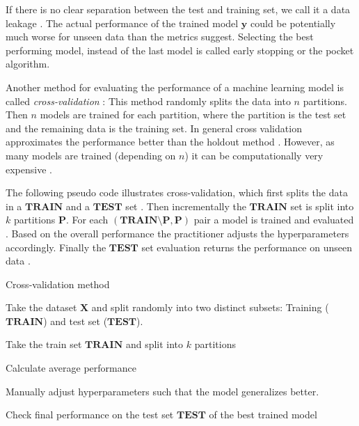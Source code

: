 \documentclass[draft,final,oneside]{vutinfth} %
\begin{document}
If there is no clear separation between the test and training set, we call it a data leakage \cite{doingdatascience}. The actual performance of the trained model $\boldsymbol{y}$ could be potentially much worse for unseen data than the metrics suggest. Selecting the best performing model, instead of the last model is called early stopping or the pocket algorithm.

Another method for evaluating the performance of a machine learning model is called \textit{cross-validation} \cite{holdoutcrossvalidation}: This method randomly splits the data into $n$ partitions. Then $n$ models are trained for each partition, where the partition is the test set and the remaining data is the training set. In general cross validation approximates the performance better than the holdout method \cite{aimodern}. However, as many models are trained (depending on $n$) it can be computationally very expensive  \cite{bishop}.

The following pseudo code illustrates cross-validation, which first splits the data in a $\boldsymbol{TRAIN}$ and a $\boldsymbol{TEST}$ set \cite{holdoutcrossvalidation}. Then incrementally the $\boldsymbol{TRAIN}$ set is split into $k$ partitions $\boldsymbol{P}$. For each $(\boldsymbol{TRAIN} \setminus \boldsymbol{P}, \boldsymbol{P})$ pair a model is trained and evaluated \cite{bishop}. Based on the overall performance the practitioner adjusts the hyperparameters accordingly. Finally the $\boldsymbol{TEST}$ set evaluation returns the performance on unseen data \cite{holdoutcrossvalidation}.

\begin{algorithm}
\caption{Cross-validation method \cite{holdoutcrossvalidation}}\label{holdoutalgo}
Take the dataset $\boldsymbol{X}$ and split randomly into two distinct subsets: Training ($\boldsymbol{TRAIN}$) and test set ($\boldsymbol{TEST}$).

 {
Take the train set $\boldsymbol{TRAIN}$ and split into $k$ partitions


Calculate average performance

Manually adjust hyperparameters such that the model generalizes better.
}

Check final performance on the test set $\boldsymbol{TEST}$ of the best trained model

\end{algorithm}
\end{document}
